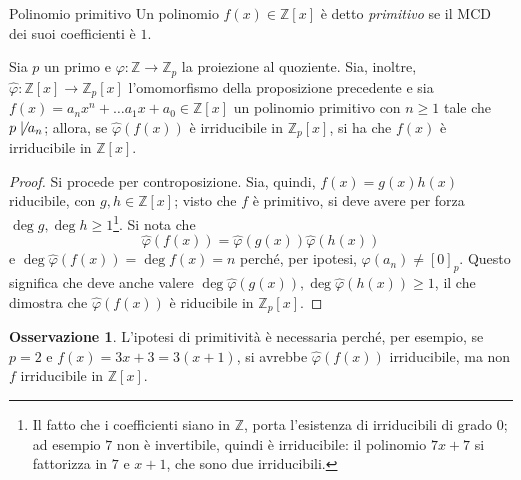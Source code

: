 \documentclass[11pt, a4paper]{scrartcl}
\theoremstyle{definition}
\numberwithin{esempio}{section}
\theoremstyle{definition}
\newtheorem{obs}{Osservazione}
\numberwithin{obs}{section}
\numberwithin{nota}{section}
\numberwithin{equation}{subsection}
\begin{document}
\begin{definizione}
	{Polinomio primitivo}{}
	Un polinomio $f(x) \in \mathbb{Z}[x]$ \`e detto \textit{primitivo} se il MCD dei suoi coefficienti \`e $1$.
\end{definizione}
\begin{prop}
	{}{}
	Sia $p$ un primo e $\varphi  : \mathbb{Z}\to \mathbb{Z}_p$ la proiezione al quoziente. 
	Sia, inoltre, $\hat{\varphi }: \mathbb{Z}[x] \to \mathbb{Z}_p [x]$ l'omomorfismo della proposizione precedente e sia $f(x) = a_n x^n + \ldots a_1 x + a_0 \in \mathbb{Z}[x]$ un polinomio primitivo con $n \ge 1 $ tale che $p  \not \mid a_n$; allora, se $\hat{\varphi }(f(x))$ \`e irriducibile in $\mathbb{Z}_p [x]$, si ha che $f(x)$ \`e irriducibile in $\mathbb{Z}[x]$.
	\begin{proof}
		Si procede per controposizione.
		Sia, quindi, $f(x) = g(x) h(x)$ riducibile, con $g,h \in \mathbb{Z}[x]$; visto che $f$ \`e primitivo, si deve avere per forza $\operatorname{deg} g , \operatorname{deg} h \ge 1$\footnote{Il fatto che i coefficienti siano in $\mathbb{Z}$, porta l'esistenza di irriducibili di grado $0$; ad esempio $7$ non \`e invertibile, quindi \`e irriducibile: il polinomio $7x + 7$ si fattorizza in $7$ e $x+1$, che sono due irriducibili.}.
		Si nota che
		\[
		\hat{\varphi }(f(x)) = \hat{\varphi }(g(x)) \hat{\varphi }(h(x))
		\] 
		e $\operatorname{deg} \hat{\varphi }(f(x)) = \operatorname{deg} f(x) = n$ perch\'e, per ipotesi, $\varphi (a_n) \neq [0]_p$.
		Questo significa che deve anche valere $\operatorname{deg} \hat{\varphi }(g(x)), \operatorname{deg} \hat{\varphi }(h(x)) \ge 1$, il che dimostra che $\hat{\varphi }(f(x))$ \`e riducibile in $\mathbb{Z}_p[x]$.
	\end{proof}
\end{prop}
\begin{obs}
	L'ipotesi di primitivit\`a \`e necessaria perch\'e, per esempio, se $p=2$ e $f(x) = 3x + 3 = 3(x+1)$, si avrebbe $\hat{\varphi }(f(x))$ irriducibile, ma non $f$ irriducibile in $\mathbb{Z}[x]$.
\end{obs}
\end{document}
